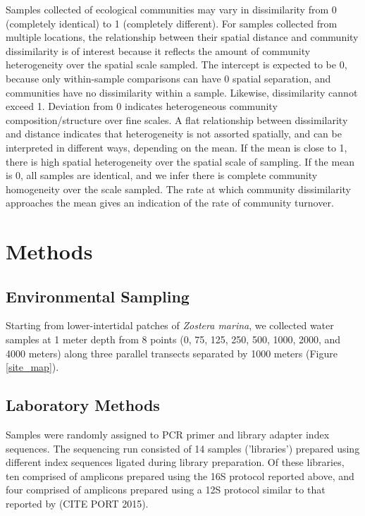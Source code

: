 \documentclass[11pt,letterpaper]{article} %
\begin{document}
Samples collected of ecological communities may vary in dissimilarity from 0 (completely identical) to 1 (completely different). 
For samples collected from multiple locations, the relationship between their spatial distance and community dissimilarity is of interest because it reflects the amount of community heterogeneity over the spatial scale sampled.
The intercept is expected to be 0, because only within-sample comparisons can have 0 spatial separation, and communities have no dissimilarity within a sample. %
Likewise, dissimilarity cannot exceed 1. 
Deviation from 0 indicates heterogeneous community composition/structure over fine scales.
A flat relationship between dissimilarity and distance indicates that heterogeneity is not assorted spatially, and can be interpreted in different ways, depending on the mean.
If the mean is close to 1, there is high spatial heterogeneity over the spatial scale of sampling.
If the mean is 0, all samples are identical, and we infer there is complete community homogeneity over the scale sampled.
The rate at which community dissimilarity approaches the mean gives an indication of the rate of community turnover.

\section*{Methods}
\subsection*{Environmental Sampling}
Starting from lower-intertidal patches of \textit{Zostera marina}, we collected water samples at 1 meter depth from 8 points (0, 75, 125, 250, 500, 1000, 2000, and 4000 meters) along three parallel transects separated by 1000 meters (Figure \ref{site_map}).

\subsection*{Laboratory Methods}

Samples were randomly assigned to PCR primer and library adapter index sequences.
The sequencing run consisted of 14 samples ('libraries') prepared using different index sequences ligated during library preparation.
Of these libraries, ten comprised of amplicons prepared using the 16S protocol reported above, and four comprised of amplicons prepared using a 12S protocol similar to that reported by (CITE PORT 2015).
\end{document}
